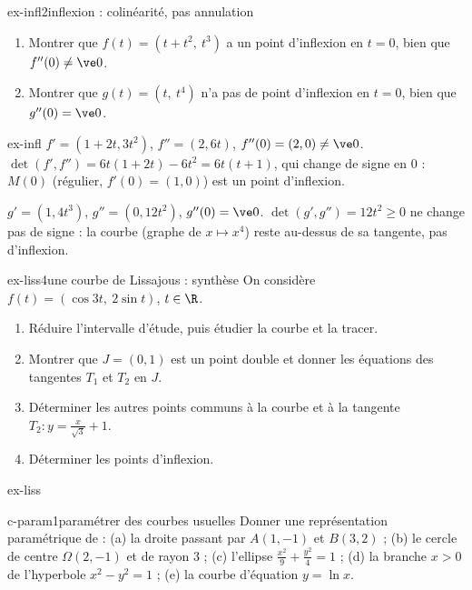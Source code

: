 \begin{exo}{ex-infl}{2}{inflexion : colinéarité, pas annulation}
\begin{enumerate}
\item Montrer que $f(t)=(t+t^2,\ t^3)$ a un point d'inflexion en $t=0$, bien que $f''(0)\neq\ve0$.
\item Montrer que $g(t)=(t,\ t^4)$ n'a pas de point d'inflexion en $t=0$, bien que $g''(0)=\ve0$.
\end{enumerate}
\end{exo}

\begin{corrige}{ex-infl}
 $f'=(1+2t,3t^2)$, $f''=(2,6t)$, $f''(0)=(2,0)\neq\ve0$. $\det(f',f'')=6t(1+2t)-6t^2=6t(t+1)$, qui change de signe en $0$ : $M(0)$ (régulier, $f'(0)=(1,0)$) est un point d'inflexion.

 $g'=(1,4t^3)$, $g''=(0,12t^2)$, $g''(0)=\ve0$. $\det(g',g'')=12t^2\geq0$ ne change pas de signe : la courbe (graphe de $x\mapsto x^4$) reste au-dessus de sa tangente, pas d'inflexion.
\end{corrige}

\begin{exo}{ex-liss}{4}{une courbe de Lissajous : synthèse}
On considère $f(t)=(\cos3t,\ 2\sin t)$, $t\in\R$.
\begin{enumerate}
\item Réduire l'intervalle d'étude, puis étudier la courbe et la tracer.
\item Montrer que $J=(0,1)$ est un point double et donner les équations des tangentes $T_1$ et $T_2$ en $J$.
\item Déterminer les autres points communs à la courbe et à la tangente $T_2:y=\frac x{\sqrt3}+1$.
\item Déterminer les points d'inflexion.
\end{enumerate}
\end{exo}

\begin{corrige}{ex-liss}
\end{corrige}

\begin{exo}{c-param}{1}{paramétrer des courbes usuelles}
Donner une représentation paramétrique de :
(a) la droite passant par $A(1,-1)$ et $B(3,2)$ ;
(b) le cercle de centre $\Omega(2,-1)$ et de rayon $3$ ;
(c) l'ellipse $\frac{x^2}9+\frac{y^2}4=1$ ;
(d) la branche $x>0$ de l'hyperbole $x^2-y^2=1$ ;
(e) la courbe d'équation $y=\ln x$.
\end{exo}

